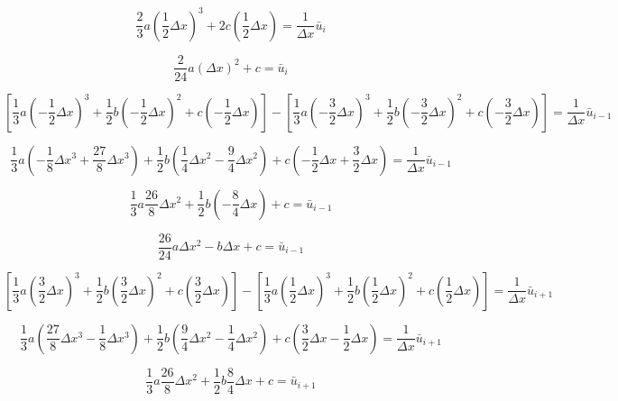 \documentclass[12pt]{article}
\begin{document}
\begin{dmath*}
\frac{2}{3}a(\frac{1}{2}\Delta x)^3 + 2c(\frac{1}{2}\Delta x)  = \frac{1}{\Delta x}\bar{u}_i 
\end{dmath*}

\begin{dmath}
\label{ciint}
\frac{2}{24}a(\Delta x)^2 + c =\bar{u}_i 
\end{dmath}

\begin{dmath*}
\left[\frac{1}{3}a(-\frac{1}{2}\Delta x)^3 + \frac{1}{2}b(-\frac{1}{2}\Delta x)^2 +c(-\frac{1}{2}\Delta x)\right] - \left[\frac{1}{3}a(-\frac{3}{2}\Delta x)^3 + \frac{1}{2}b(-\frac{3}{2}\Delta x)^2 +c(-\frac{3}{2}\Delta x)\right]  = \frac{1}{\Delta x} \bar{u}_{i-1} 
\end{dmath*}

\begin{dmath*}
\frac{1}{3}a \left(-\frac{1}{8}\Delta x^3 + \frac{27}{8 } \Delta x^3\right) + \frac{1}{2}b \left(\frac{1}{4}\Delta x^2 - \frac{9}{4}\Delta x ^2\right) + c \left(-\frac{1}{2}\Delta x + \frac{3}{2}\Delta x\right) = \frac{1}{\Delta x} \bar{u}_{i-1} 
\end{dmath*}

\begin{dmath*}
\frac{1}{3}a\frac{26}{8}\Delta x^2 + \frac{1}{2}b \left(- \frac{8}{4}\Delta x\right) + c = \bar{u}_{i-1} 
\end{dmath*}

\begin{dmath}
\label{ci-1int}
\frac{26}{24}a\Delta x^2 - b\Delta x + c = \bar{u}_{i-1} 
\end{dmath}

\begin{dmath*}
\left[\frac{1}{3}a(\frac{3}{2}\Delta x)^3 + \frac{1}{2}b(\frac{3}{2}\Delta x)^2 +c(\frac{3}{2}\Delta x)\right] - \left[\frac{1}{3}a(\frac{1}{2}\Delta x)^3 + \frac{1}{2}b(\frac{1}{2}\Delta x)^2 +c(\frac{1}{2}\Delta x)\right]  = \frac{1}{\Delta x}\bar{u}_{i+1} 
\end{dmath*}

\begin{dmath*}
\frac{1}{3} a \left(\frac{27}{8} \Delta x^3 - \frac{1}{8}\Delta x^3\right) + \frac{1}{2}b\left(\frac{9}{4}\Delta x^2 - \frac{1}{4}\Delta x^2\right) + c \left(\frac{3}{2}\Delta x - \frac{1}{2}\Delta x\right) = \frac{1}{\Delta x}\bar{u}_{i+1}
\end{dmath*}

\begin{dmath*}
\frac{1}{3} a \frac{26}{8} \Delta x^2 + \frac{1}{2}b\frac{8}{4}\Delta x + c = \bar{u}_{i+1}
\end{dmath*}
\end{document}
